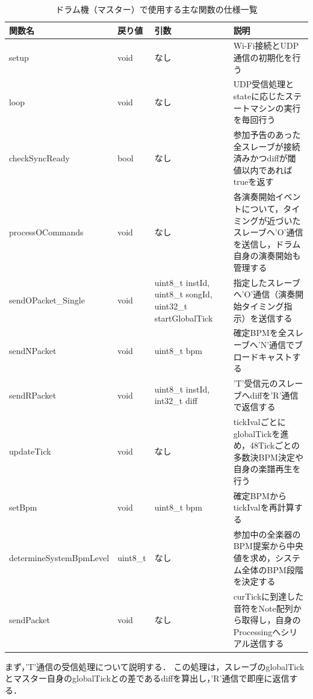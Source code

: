 \begin{table}[H]
    \caption{ドラム機（マスター）で使用する主な関数の仕様一覧}
    \centering
    \label{table:douki_master_func}
    \begin{tabular}{p{5.0cm}p{1.5cm}p{3.6cm}p{3.2cm}}
    \hline
    \textbf{関数名} & \textbf{戻り値} & \textbf{引数} & \textbf{説明}\\
    \hline
    setup & void & なし & Wi-Fi接続とUDP通信の初期化を行う\\
    \hline
    loop & void & なし & UDP受信処理とstateに応じたステートマシンの実行を毎回行う\\
    \hline
    checkSyncReady & bool & なし & 参加予告のあった全スレーブが接続済みかつdiffが閾値以内であればtrueを返す\\
    \hline
    processOCommands & void & なし & 各演奏開始イベントについて，タイミングが近づいたスレーブへ'O'通信を送信し，ドラム自身の演奏開始も管理する\\
    \hline
    sendOPacket\_Single & void & uint8\_t instId, uint8\_t songId, uint32\_t startGlobalTick & 指定したスレーブへ'O'通信（演奏開始タイミング指示）を送信する\\
    \hline
    sendNPacket & void & uint8\_t bpm & 確定BPMを全スレーブへ'N'通信でブロードキャストする\\
    \hline
    sendRPacket & void & uint8\_t instId, int32\_t diff & 'T'受信元のスレーブへdiffを'R'通信で返信する\\
    \hline
    updateTick & void & なし & tickIvalごとにglobalTickを進め，48Tickごとの多数決BPM決定や自身の楽譜再生を行う\\
    \hline
    setBpm & void & uint8\_t bpm & 確定BPMからtickIvalを再計算する\\
    \hline
    determineSystemBpmLevel & uint8\_t & なし & 参加中の全楽器のBPM提案から中央値を求め，システム全体のBPM段階を決定する\\
    \hline
    sendPacket & void & なし & curTickに到達した音符をNote配列から取得し，自身のProcessingへシリアル送信する\\
    \hline
    \end{tabular}
\end{table}

\fi

\noindent
まず，'T'通信の受信処理について説明する．
この処理は，スレーブのglobalTickとマスター自身のglobalTickとの差であるdiffを算出し，'R'通信で即座に返信する．

\iffalse

